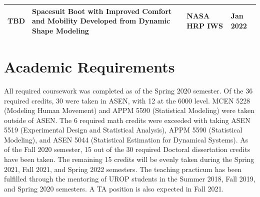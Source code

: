 \documentclass[defaultstyle,11pt]{comps}
\begin{document}
\begin{longtable}[]{@{}llll@{}}
\begin{minipage}[t]{0.22\columnwidth}
TBD\strut
\end{minipage} & \begin{minipage}[t]{0.22\columnwidth}\raggedright
Spacesuit Boot with Improved Comfort and Mobility Developed from Dynamic Shape Modeling\strut
\end{minipage} & \begin{minipage}[t]{0.22\columnwidth}\raggedright
NASA HRP IWS\strut
\end{minipage} & \begin{minipage}[t]{0.22\columnwidth}\raggedright
Jan 2022\strut
\end{minipage}\tabularnewline
\bottomrule
\end{longtable}

\hypertarget{academic-requirements}{%
\section{Academic Requirements}\label{academic-requirements}}

All required coursework was completed as of the Spring 2020 semester. Of the 36 required credits, 30 were taken in ASEN, with 12 at the 6000 level. MCEN 5228 (Modeling Human Movement) and APPM 5590 (Statistical Modeling) were taken outside of ASEN. The 6 required math credits were exceeded with taking ASEN 5519 (Experimental Design and Statistical Analysis), APPM 5590 (Statistical Modeling), and ASEN 5044 (Statistical Estimation for Dynamical Systems). As of the Fall 2020 semester, 15 out of the 30 required Doctoral dissertation credits have been taken. The remaining 15 credits will be evenly taken during the Spring 2021, Fall 2021, and Spring 2022 semesters. The teaching practicum has been fulfilled through the mentoring of UROP students in the Summer 2018, Fall 2019, and Spring 2020 semesters. A TA position is also expected in Fall 2021.


\newpage



\end{document}
